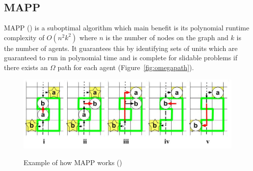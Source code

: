 \documentclass[a4paper,11pt]{article}
\begin{document}

\subsection{MAPP}
MAPP (\cite{wang2011mapp}) is a suboptimal algorithm which main benefit is its polynomial runtime complexity of $O(n^2k^2)$ where $n$ is the number of nodes on the graph and $k$ is the number of agents. It guarantees this by identifying sets of units which are guaranteed to run in polynomial time and is complete for slidable problems if there exists an $\Omega$ path for each agent (Figure~\ref{fig:omegapath}).


\begin{figure}[H]
	\centering
	\includegraphics[width=\linewidth]{graphics/mappblank}
	\label{fig:mappblank}
	\caption{Example of how MAPP works (\cite{wang2011mapp})}
\end{figure}
\end{document}
